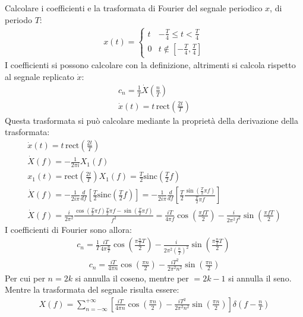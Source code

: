 \documentclass{article}
\begin{document}
Calcolare i coefficienti e la trasformata di Fourier del segnale periodico $x$, di periodo $T$:
\begin{gather*}
    x(t)=\begin{cases}
        t&\displaystyle-\frac{T}{4}\leq t<\frac{T}{4}\\
        0&t\notin\left[\displaystyle-\frac{T}{4},\frac{T}{4}\right]
    \end{cases}
\end{gather*}
I coefficienti si possono calcolare con la definizione, altrimenti si calcola rispetto al segnale replicato $\dot x$:
\begin{gather*}
    c_n=\displaystyle\frac{1}{\overline{T}}\dot X\left(\frac{n}{\overline{T}}\right)\\
    \dot x(t)=t\,\mbox{rect}\left(\displaystyle\frac{2t}{T}\right)
\end{gather*}
Questa trasformata si può calcolare mediante la proprietà della derivazione della trasformata:
\begin{gather*}
    \dot x(t)=t\,\mbox{rect}\displaystyle\left(\frac{2t}{T}\right)\\
    \dot X(f)=\displaystyle-\frac{1}{2\pi i}X_1(f)\\
    x_1(t)=\mbox{rect}\displaystyle\left(\frac{2t}{T}\right)
    X_1(f)=\displaystyle\frac{T}{2}\mbox{sinc}\left(\frac{T}{2}f\right)\\
    \dot X(f)=-\displaystyle\frac{1}{2i\pi} \frac{d}{df}\left[\frac{T}{2}\mbox{sinc}\left(\frac{T}{2}f\right)\right]=-\frac{1}{2i\pi}\frac{d}{df}\left[\frac{T}{2}\frac{\sin\left(\frac{T}{2}\pi f\right)}{\frac{T}{2}\pi f}\right]\\
    \dot X(f)=\displaystyle\frac{i}{2\pi^2}\frac{\cos\left(\frac{T}{2}\pi f\right)\frac{T}{2}\pi f-\sin\left(\frac{T}{2}\pi f\right)}{f^2}=\frac{iT}{4\pi f}\cos\left(\frac{\pi fT}{2}\right)-\frac{i}{2\pi^2f^2}\sin\left(\frac{\pi fT}{2}\right)
\end{gather*}
I coefficienti di Fourier sono allora:
\begin{gather*}
    c_n=\displaystyle\frac{1}{T}\frac{iT}{4\pi \frac{n}{T}}\cos\left(\frac{\pi \frac{n}{T}T}{2}\right)-\frac{i}{2\pi^2\left(\frac{n}{T}\right)^2}\sin\left(\frac{\pi \frac{n}{T}T}{2}\right)\
\end{gather*}
\begin{gather}
    c_n=\displaystyle\frac{iT}{4\pi n}\cos\left(\frac{\pi n}{2}\right)-\frac{iT^2}{2\pi^2n^2}\sin\left(\frac{\pi n}{2}\right)
\end{gather}
Per cui per $n=2k$ si annulla il coseno, mentre per $=2k-1$ si annulla il seno. Mentre la trasformata del segnale risulta essere:
\begin{gather}
    X(f)=\displaystyle\sum_{n=-\infty}^{+\infty}\left[\frac{iT}{4\pi n}\cos\left(\frac{\pi n}{2}\right)-\frac{iT^2}{2\pi^2n^2}\sin\left(\frac{\pi n}{2}\right)\right]\delta\left(f-\frac{n}{T}\right)
\end{gather}
\end{document}
